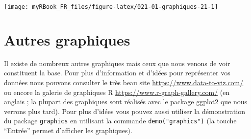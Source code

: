 \documentclass[twoside,symmetric]{book}
\newenvironment{Shaded}{}{}
\newcommand{\DataTypeTok}[1]{\underline{#1}}
\newcommand{\DecValTok}[1]{#1}
\newcommand{\KeywordTok}[1]{\textbf{#1}}
\newcommand{\NormalTok}[1]{#1}
\newcommand{\OperatorTok}[1]{#1}
\newcommand{\OtherTok}[1]{#1}
\newcommand{\StringTok}[1]{#1}
\begin{document}
\begin{Shaded}
\end{Shaded}

\texttt{[image: myRBook\_FR\_files/figure-latex/021-01-graphiques-21-1]}

\hypertarget{autres-graphiques}{%
\section{Autres graphiques}\label{autres-graphiques}}

Il existe de nombreux autres graphiques mais ceux que nous venons de voir constituent la base. Pour plus d'information et d'idées pour représenter vos données nous pouvons consulter le très beau site \url{https://www.data-to-viz.com/} ou encore la galerie de graphiques R \url{https://www.r-graph-gallery.com/} (en anglais ; la plupart des graphiques sont réalisés avec le package ggplot2 que nous verrons plus tard). Pour plus d'idées vous pouvez aussi utiliser la démonstration du package \texttt{graphics} en utilisant la commande \texttt{demo("graphics")} (la touche ``Entrée'' permet d'afficher les graphiques).
\end{document}
